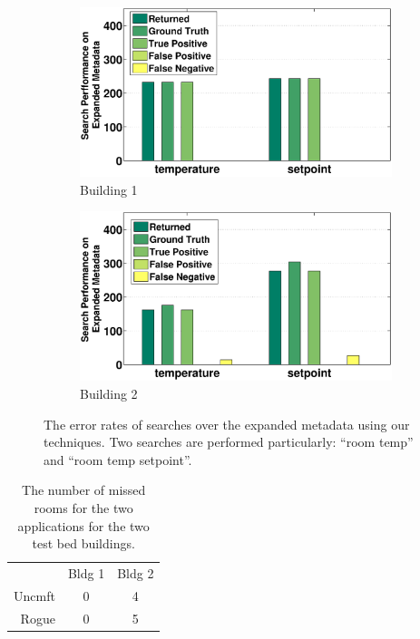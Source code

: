 \begin{figure}[h!]
\centering
	\begin{subfigure}{0.48\textwidth}
                \centering
		\includegraphics[width=\textwidth]{./figs/50-soda.eps}
                \caption{Building 1}
	\end{subfigure}
	\begin{subfigure}{0.48\textwidth}
                \centering
		\includegraphics[width=\textwidth]{./figs/50-sdh.eps}
                \caption{Building 2}
	\end{subfigure}
\caption{The error rates of searches over the expanded metadata using our techniques. Two searches are performed particularly: ``room temp'' and ``room temp setpoint''.}
\label{fig:error}
\end{figure}

\begin{table}[ht!]
 \begin{center}
\begin{tabular}{rcc}
\multicolumn{1}{l}{} & Bldg 1                 & Bldg 2                  \\ \cline{2-3} 
Uncmft               & \multicolumn{1}{|c}{0} & \multicolumn{1}{|c|}{4} \\ \cline{2-3} 
Rogue                & \multicolumn{1}{|c}{0} & \multicolumn{1}{|c|}{5} \\ \cline{2-3} 
\end{tabular}
 \end{center}
 \caption{The number of missed rooms for the two applications for the two test bed buildings.}
 \label{tab:cluster}
\end{table}